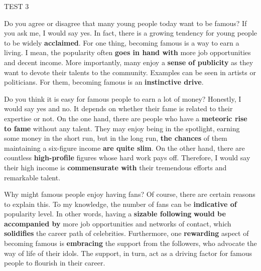 \begin{glossarymc}[Cambridge 15]
\begin{test}{TEST 3}
    \begin{qa}{Do you agree or disagree that many young people today want to be famous?}
    If you ask me, I would say yes. In fact, there is a growing tendency for young people to be widely \textbf{acclaimed}. For one thing, becoming famous is a way to earn a living. I mean, the popularity often \textbf{goes in hand with} more job opportunities and decent income. More importantly, many enjoy a \textbf{sense of publicity} as they want to devote their talents to the community. Examples can be seen in artists or politicians. For them, becoming famous is an \textbf{instinctive drive}.
    \end{qa}

    \begin{qa}{Do you think it is easy for famous people to earn a lot of money?}
    Honestly, I would say yes and no. It depends on whether their fame is related to their expertise or not. On the one hand, there are people who have a \textbf{meteoric rise to fame} without any talent. They may enjoy being in the spotlight, earning some money in the short run, but in the long run, \textbf{the chances} of them maintaining a six-figure income \textbf{are quite slim}. On the other hand, there are countless \textbf{high-profile} figures whose hard work pays off. Therefore, I would say their high income is \textbf{commensurate with} their tremendous efforts and remarkable talent.
    \end{qa}

    \begin{qa}{Why might famous people enjoy having fans?}
    Of course, there are certain reasons to explain this. To my knowledge, the number of fans can be \textbf{indicative of} popularity level. In other words, having a \textbf{sizable following} \textbf{would be accompanied by} more job opportunities and networks of contact, which \textbf{solidifies} the career path of celebrities. Furthermore, one \textbf{rewarding} aspect of becoming famous is \textbf{embracing} the support from the followers, who advocate the way of life of their idols. The support, in turn, act as a driving factor for famous people to flourish in their career.
    \end{qa}


\end{test}
\end{glossarymc}
